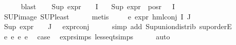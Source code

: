 \begin{isabellebody}
\ \ \ \ \isamarkupfalse%
\ blast\isanewline
\ \ \isamarkupfalse%
\ {\isachardoublequoteopen}Sup\ {\isacharparenleft}{\kern0pt}{\isacharparenleft}{\kern0pt}expr{\isacharunderscore}{\kern0pt}{}\ {\isasymcirc}\ {\isasymPhi}{\isacharparenright}{\kern0pt}\ {\isacharbackquote}{\kern0pt}\ I{\isacharparenright}{\kern0pt}\ {\isasymle}\ {}{\isachardoublequoteclose}\isanewline
{}\ {\isachardoublequoteopen}Sup\ {\isacharparenleft}{\kern0pt}{\isacharparenleft}{\kern0pt}expr{\isacharunderscore}{\kern0pt}{}\ {\isacharbackquote}{\kern0pt}\ {\isacharparenleft}{\kern0pt}pos{\isacharunderscore}{\kern0pt}r\ {\isacharparenleft}{\kern0pt}{\isasymPhi}\ {\isacharbackquote}{\kern0pt}\ I{\isacharparenright}{\kern0pt}{\isacharparenright}{\kern0pt}{\isacharparenright}{\kern0pt}{\isacharparenright}{\kern0pt}\ {\isasymle}\ {}{\isachardoublequoteclose}\isanewline
\ \ \ \ \isamarkupfalse%
\ SUP{\isacharunderscore}{\kern0pt}image\ SUP{\isacharunderscore}{\kern0pt}least\isanewline
\ \ \ \ \isamarkupfalse%
\ metis{\isacharplus}{\kern0pt}\ \isanewline
\ \ \isamarkupfalse%
\ e{}{\isacharcolon}{\kern0pt}\ {\isachardoublequoteopen}expr{\isacharunderscore}{\kern0pt}{}\ {\isacharparenleft}{\kern0pt}hml{\isacharunderscore}{\kern0pt}conj\ I\ J\ {\isasymPhi}{\isacharparenright}{\kern0pt}\ {\isasymle}\ {}{\isachardoublequoteclose}\isanewline
\ \ \ \ \isamarkupfalse%
\ {\isacartoucheopen}Sup\ {\isacharparenleft}{\kern0pt}{\isacharparenleft}{\kern0pt}expr{\isacharunderscore}{\kern0pt}{}\ {\isasymcirc}\ {\isasymPhi}{\isacharparenright}{\kern0pt}\ {\isacharbackquote}{\kern0pt}\ J{\isacharparenright}{\kern0pt}\ {\isasymle}\ {}{\isacartoucheclose}\ expr{\isacharunderscore}{\kern0pt}{}{\isacharunderscore}{\kern0pt}conj\isanewline
\ \ \ \ \isamarkupfalse%
\ {\isacharparenleft}{\kern0pt}simp\ add{\isacharcolon}{\kern0pt}\ Sup{\isacharunderscore}{\kern0pt}union{\isacharunderscore}{\kern0pt}distrib\ sup{\isachardot}{\kern0pt}orderE{\isacharparenright}{\kern0pt}\isanewline
\ \ \isamarkupfalse%
\ e{}\ e{}\ e{}\ e{}\ \isamarkupfalse%
\ {\isacharquery}{\kern0pt}case\ \isamarkupfalse%
\ expr{\isachardot}{\kern0pt}simps\ less{\isacharunderscore}{\kern0pt}eq{\isacharunderscore}{\kern0pt}t{\isachardot}{\kern0pt}simps\isanewline
\ \ \ \ \isamarkupfalse%
\ auto\isanewline

\end{isabellebody}
